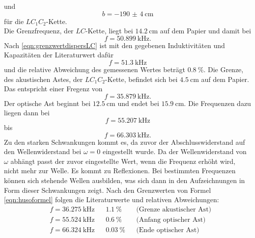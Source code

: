 \documentclass[
  bibliography=totoc,     %
  captions=tableheading,  %
  titlepage=firstiscover, %
]{scrartcl}
\begin{document}
und
\begin{equation}
  b= \SI{-190(4)}{\centi\meter}
\end{equation}
für die $LC_1C_2$-Kette.
\\
Die Grenzfrequenz, der $LC$-Kette, liegt bei $\SI{14.2}{\centi\meter}$ auf dem Papier
und damit bei
\begin{equation}
  f = \SI{50.899}{\kilo\hertz}.
\end{equation}
Nach \eqref{eqn:grenzwertdispersLC} ist mit den gegebenen Induktivitäten und Kapazitäten der Literaturwert
dafür
\begin{equation}
  f = \SI{51.3}{\kilo\hertz}
\end{equation}
und die relative Abweichung des gemessenen Wertes
beträgt $\SI{0.8}{\percent}$.
\clearpage
Die Grenze, des akustischen Astes, der $LC_1C_2$-Kette, befindet sich bei $\SI{4.5}{\centi\meter}$ auf dem Papier.
Das entspricht einer Fregenz von
\begin{equation}
  f = \SI{35.879}{\kilo\hertz}.
\end{equation}
Der optische Ast beginnt bei $\SI{12.5}{\centi\meter}$ und endet bei $\SI{15.9}{\centi\meter}$.
Die Frequenzen dazu liegen dann bei
\begin{equation}
  f = \SI{55.207}{\kilo\hertz}
\end{equation}
bis
\begin{equation}
  f = \SI{66.303}{\kilo\hertz}.
\end{equation}
Zu den starken Schwankungen kommt es, da zuvor der Abschlusswiderstand auf den Wellenwiderstand
bei $\omega = 0$ eingestellt wurde. Da der Wellenwiderstand von $\omega$ abhängt
passt der zuvor eingestellte Wert, wenn die Frequenz erhöht wird, nicht mehr zur
Welle. Es kommt zu Reflexionen. Bei bestimmten Frequenzen können sich stehende Wellen
ausbilden, was sich dann in den Aufzeichnungen in Form dieser Schwankungen zeigt.
Nach den Grenzwerten von Formel \eqref{eqn:husoformel} folgen die Literaturwerte
und relativen Abweichungen:
\begin{align}
  &f = \SI{36.275}{\kilo\hertz} & &\SI{1.1}{\percent} & &\text{(Grenze akustischer Ast)}\\
  &f = \SI{55.524}{\kilo\hertz} & &\SI{0.6}{\percent} & &\text{(Anfang optischer Ast)}\\
  &f = \SI{66.324}{\kilo\hertz} & &\SI{0.03}{\percent} & &\text{(Ende optischer Ast)}
\end{align}
\end{document}
